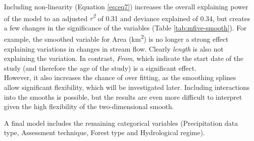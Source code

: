 \documentclass[]{elsarticle} %
\begin{document}
Including non-linearity (Equation \eqref{eq:eq7}) increases the overall explaining power of the model to an adjusted \emph{r\textsuperscript{2}} of 0.31 and deviance explained of 0.34, but creates a few changes in the significance of the variables (Table \ref{tab:mfive-smooth}). For example, the smoothed variable for Area (km\textsuperscript{2}) is no longer a strong effect explaining variations in changes in stream flow. Clearly \emph{length} is also not explaining the variation. In contrast, \emph{From}, which indicate the start date of the study (and therefore the age of the study) is a significant effect.\\
However, it also increases the chance of over fitting, as the smoothing splines allow significant flexibility, which will be investigated later. Including interactions into the smooths is possible, but the results are even more difficult to interpret given the high flexibility of the two-dimensional smooth.

A final model includes the remaining categorical variables (Precipitation data type, Assessment technique, Forest type and Hydrological regime).
\end{document}
